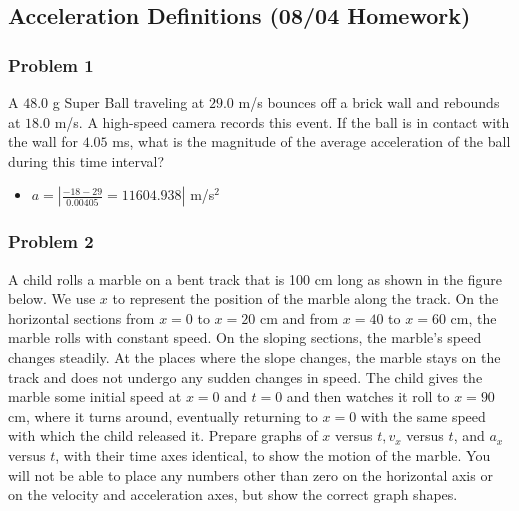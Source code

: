 \documentclass[
  letterpaper,
  DIV=11,
  numbers=noendperiod]{scrartcl}
\providecommand{\tightlist}{%
  \setlength{\itemsep}{0pt}\setlength{\parskip}{0pt}}\usepackage{longtable,booktabs,array}
\begin{document}
\hypertarget{acceleration-definitions-0804-homework}{%
\subsection{Acceleration Definitions (08/04
Homework)}\label{acceleration-definitions-0804-homework}}

\hypertarget{problem-1-2}{%
\subsubsection{Problem 1}\label{problem-1-2}}

A \(48.0\) g Super Ball traveling at \(29.0\) m/s bounces off a brick
wall and rebounds at \(18.0\) m/s. A high-speed camera records this
event. If the ball is in contact with the wall for \(4.05\) ms, what is
the magnitude of the average acceleration of the ball during this time
interval?

\begin{itemize}
\tightlist
\item
  \(a = \left|\frac{-18-29}{0.00405} = 11604.938\right|\) m/s\(^2\)
\end{itemize}

\newpage{}

\hypertarget{problem-2-2}{%
\subsubsection{Problem 2}\label{problem-2-2}}

A child rolls a marble on a bent track that is 100 cm long as shown in
the figure below. We use \(x\) to represent the position of the marble
along the track. On the horizontal sections from \(x=0\) to \(x=20\) cm
and from \(x=40\) to \(x=60\) cm, the marble rolls with constant speed.
On the sloping sections, the marble's speed changes steadily. At the
places where the slope changes, the marble stays on the track and does
not undergo any sudden changes in speed. The child gives the marble some
initial speed at \(x=0\) and \(t=0\) and then watches it roll to
\(x=90\) cm, where it turns around, eventually returning to \(x=0\) with
the same speed with which the child released it. Prepare graphs of \(x\)
versus \(t, v_x\) versus \(t\), and \(a_x\) versus \(t\), with their
time axes identical, to show the motion of the marble. You will not be
able to place any numbers other than zero on the horizontal axis or on
the velocity and acceleration axes, but show the correct graph shapes.
\end{document}
